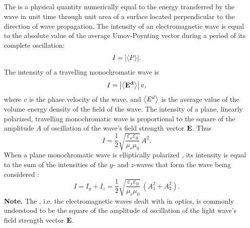 \subsection{}\label{31.2.4} The  is a physical quantity numerically equal to the energy transferred by the wave in unit time through unit area of a surface located perpendicular to the direction of wave propagation. The intensity of an electromagnetic wave is equal to the absolute value of the average Umov-Poynting vector during a period of its complete oscillation:
\begin{equation*}%
I = \abs{\expval{{P}}}.
\end{equation*}
The intensity of a travelling monochromatic wave is
\begin{equation*}%
I = \abs{\expval{\vb{E^{d}}}}\, v,
\end{equation*}
where $v$ is the phase velocity of the wave, and $\expval{E^{d}}$ is the average value of the volume energy density of the field of the wave. The intensity of a plane, linearly polarized, travelling monochromatic wave  is proportional to the square of the amplitude $A$ of oscillation of the wave's field strength vector $\vb{E}$.
Thus
\begin{equation*}%
I = \frac{1}{2} \sqrt{\frac{\varepsilon_{r} \varepsilon_{0}}{ \mu_{r}\mu_{0}}} \, A^{2}.
\end{equation*}
When a plane monochromatic wave is elliptically polarized
, its intensity is equal to the sum of the intensities of the $y$- and $z$-waves that form the wave being considered :
\begin{equation*}%
I =  I_{y} + I_{z} = \frac{1}{2} \sqrt{\frac{\varepsilon_{r} \varepsilon_{0}}{ \mu_{r}\mu_{0}}} \, (A_{1}^{2} + A_{2}^{2}).
\end{equation*}
\textbf{Note.} The , i.e. the electromagnetic waves dealt with in optics, is commonly understood to be the square of the amplitude of oscillation of the light wave's field strength vector $\vb{E}$.

